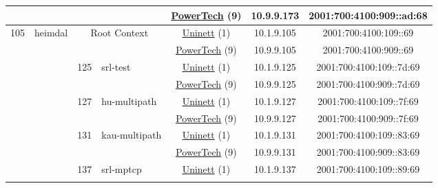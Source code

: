 \begin{small}
\begin{center}
\begin{longtable}{|c|c|c|c|c|c|c|c|}
  &  &  &  & \multicolumn{2}{|c|}{\tiny{\href{http://www.powertech.no}{PowerTech} (9)}} & \tiny{10.9.9.173} & \tiny{2001:700:4100:909::ad:68} \\ \hline
 \multirow{20}{*}{\tiny{105}} & \multicolumn{1}{|l|}{\multirow{20}{*}{\tiny{heimdal}}} & \multicolumn{2}{|c|}{\multirow{2}{*}{\tiny{Root Context}}} & \multicolumn{2}{|c|}{\tiny{\href{https://www.uninett.no}{Uninett} (1)}} & \tiny{10.1.9.105} & \tiny{2001:700:4100:109::69} \\* \cline{5-5}\cline{6-6}\cline{7-7}\cline{8-8}
  &  & \multicolumn{2}{|c|}{} & \multicolumn{2}{|c|}{\tiny{\href{http://www.powertech.no}{PowerTech} (9)}} & \tiny{10.9.9.105} & \tiny{2001:700:4100:909::69} \\* \cline{3-3}\cline{4-4}\cline{5-5}\cline{6-6}\cline{7-7}\cline{8-8}
  &  & \multirow{2}{*}{\tiny{125}} & \multicolumn{1}{|l|}{\multirow{2}{*}{\tiny{srl-test}}} & \multicolumn{2}{|c|}{\tiny{\href{https://www.uninett.no}{Uninett} (1)}} & \tiny{10.1.9.125} & \tiny{2001:700:4100:109::7d:69} \\* \cline{5-5}\cline{6-6}\cline{7-7}\cline{8-8}
  &  &  &  & \multicolumn{2}{|c|}{\tiny{\href{http://www.powertech.no}{PowerTech} (9)}} & \tiny{10.9.9.125} & \tiny{2001:700:4100:909::7d:69} \\* \cline{3-3}\cline{4-4}\cline{5-5}\cline{6-6}\cline{7-7}\cline{8-8}
  &  & \multirow{2}{*}{\tiny{127}} & \multicolumn{1}{|l|}{\multirow{2}{*}{\tiny{hu-multipath}}} & \multicolumn{2}{|c|}{\tiny{\href{https://www.uninett.no}{Uninett} (1)}} & \tiny{10.1.9.127} & \tiny{2001:700:4100:109::7f:69} \\* \cline{5-5}\cline{6-6}\cline{7-7}\cline{8-8}
  &  &  &  & \multicolumn{2}{|c|}{\tiny{\href{http://www.powertech.no}{PowerTech} (9)}} & \tiny{10.9.9.127} & \tiny{2001:700:4100:909::7f:69} \\* \cline{3-3}\cline{4-4}\cline{5-5}\cline{6-6}\cline{7-7}\cline{8-8}
  &  & \multirow{2}{*}{\tiny{131}} & \multicolumn{1}{|l|}{\multirow{2}{*}{\tiny{kau-multipath}}} & \multicolumn{2}{|c|}{\tiny{\href{https://www.uninett.no}{Uninett} (1)}} & \tiny{10.1.9.131} & \tiny{2001:700:4100:109::83:69} \\* \cline{5-5}\cline{6-6}\cline{7-7}\cline{8-8}
  &  &  &  & \multicolumn{2}{|c|}{\tiny{\href{http://www.powertech.no}{PowerTech} (9)}} & \tiny{10.9.9.131} & \tiny{2001:700:4100:909::83:69} \\* \cline{3-3}\cline{4-4}\cline{5-5}\cline{6-6}\cline{7-7}\cline{8-8}
  &  & \multirow{2}{*}{\tiny{137}} & \multicolumn{1}{|l|}{\multirow{2}{*}{\tiny{srl-mptcp}}} & \multicolumn{2}{|c|}{\tiny{\href{https://www.uninett.no}{Uninett} (1)}} & \tiny{10.1.9.137} & \tiny{2001:700:4100:109::89:69} \\* \cline{5-5}\cline{6-6}\cline{7-7}\cline{8-8}

\end{longtable}
\end{center}
\end{small}

